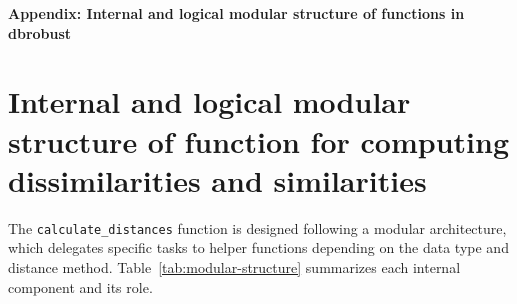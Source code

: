 \newpage
\appendix
\noindent
{\large\textbf{Appendix: Internal and logical modular structure of functions in dbrobust}}

\section{Internal and logical modular structure of function for computing dissimilarities and similarities}
\label{AppCalculateDistances}

The \texttt{calculate\_distances} function is designed following a modular architecture, which delegates specific tasks to helper functions depending on the data type and distance method. Table~\ref{tab:modular-structure} summarizes each internal component and its role.

